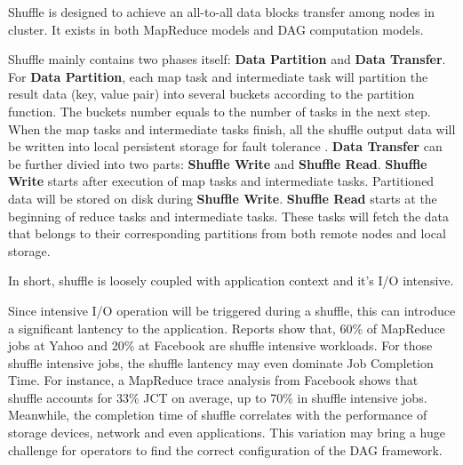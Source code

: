 \documentclass[10pt,twocolumn]{article}
\begin{document}
Shuffle is designed to achieve an all-to-all data blocks transfer among nodes in cluster. It exists in both MapReduce models and DAG computation models.

Shuffle mainly contains two phases itself: \textbf{Data Partition} and \textbf{Data Transfer}. For \textbf{Data Partition}, each map task and intermediate task will partition the result data (key, value pair) into several buckets according to the partition function.
The buckets number equals to the number of tasks in the next step. When the map tasks and intermediate tasks finish, all the shuffle output data will be written into local persistent storage for fault tolerance \cite{mapreduce, spark}.
\textbf{Data Transfer} can be further divied into two parts: \textbf{Shuffle Write} and \textbf{Shuffle Read}. \textbf{Shuffle Write} starts after execution of map tasks and intermediate tasks. Partitioned data will  be stored on disk during \textbf{Shuffle Write}. \textbf{Shuffle Read} starts at the beginning of reduce tasks and intermediate tasks. These tasks will fetch the data that belongs to their corresponding partitions from both remote nodes and local storage.

In short, shuffle is loosely coupled with application context and it's I/O intensive.

Since intensive I/O operation will be triggered during a shuffle, this can introduce a significant lantency to the application. Reports show that, 60\% of MapReduce jobs at Yahoo
and 20\% at Facebook are shuffle intensive workloads\cite{shufflewatcher}. For those shuffle intensive jobs, the shuffle lantency may even dominate Job Completion Time. 
For instance, a MapReduce trace analysis from Facebook shows that shuffle accounts for 33\% JCT on average, up to 70\% in shuffle intensive jobs\cite{managing}.
Meanwhile, the completion time of shuffle correlates with the performance of storage devices, network and even applications. 
This variation may bring a huge challenge for operators to find the correct configuration of the DAG framework.
\end{document}
